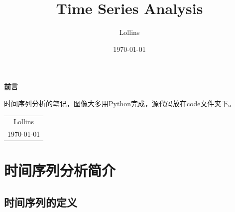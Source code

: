 \documentclass[12pt, a4paper, oneside]{ctexbook}
\begin{document}
\title{{\Huge{\textbf{Time Series Analysis}}\\}}
\author{Lollins}
\date{\today}

\maketitle

\setcounter{page}{1}

\begin{center}
    \Huge\textbf{前言}
\end{center}
\par 时间序列分析的笔记，图像大多用Python完成，源代码放在code文件夹下。


\begin{flushright}
    \begin{tabular}{c}
        Lollins \\
        \today
    \end{tabular}
\end{flushright}

\newpage
{}
\setcounter{page}{1}
\tableofcontents
\newpage
\setcounter{page}{1}

\chapter{时间序列分析简介}
\section{时间序列的定义}
\end{document}
